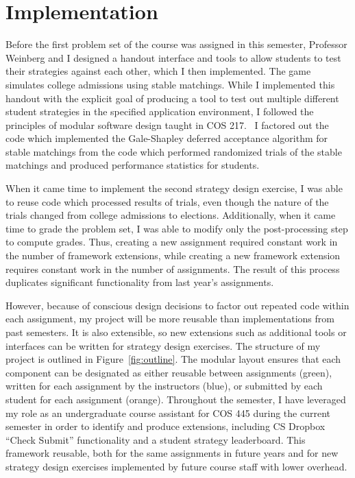 \documentclass[pageno]{jpaper}
\begin{document}
\section*{Implementation}
Before the first problem set of the course was assigned in this semester, Professor Weinberg and I designed a handout interface and tools to allow students to test their strategies against each other, which I then implemented.
The game simulates college admissions using stable matchings.
While I implemented this handout with the explicit goal of producing a tool to test out multiple different student strategies in the specified application environment, I followed the principles of modular software design taught in COS 217.~\cite{Kernighan and Pike chapter 4}
I factored out the code which implemented the Gale-Shapley deferred acceptance algorithm for stable matchings from the code which performed randomized trials of the stable matchings and produced performance statistics for students.

When it came time to implement the second strategy design exercise, I was able to reuse code which processed results of trials, even though the nature of the trials changed from college admissions to elections.
Additionally, when it came time to grade the problem set, I was able to modify only the post-processing step to compute grades.
Thus, creating a new assignment required constant work in the number of framework extensions, while creating a new framework extension requires constant work in the number of assignments.
The result of this process duplicates significant functionality from last year's assignments.

However, because of conscious design decisions to factor out repeated code within each assignment, my project will be more reusable than implementations from past semesters.
It is also extensible, so new extensions such as additional tools or interfaces can be written for strategy design exercises.
The structure of my project is outlined in Figure~\ref{fig:outline}.
The modular layout ensures that each component can be designated as either reusable between assignments (green), written for each assignment by the instructors (blue), or submitted by each student for each assignment (orange).
Throughout the semester, I have leveraged my role as an undergraduate course assistant for COS 445 during the current semester in order to identify and produce extensions, including CS Dropbox ``Check Submit'' functionality and a student strategy leaderboard.
This framework reusable, both for the same assignments in future years and for new strategy design exercises implemented by future course staff with lower overhead.
\end{document}
